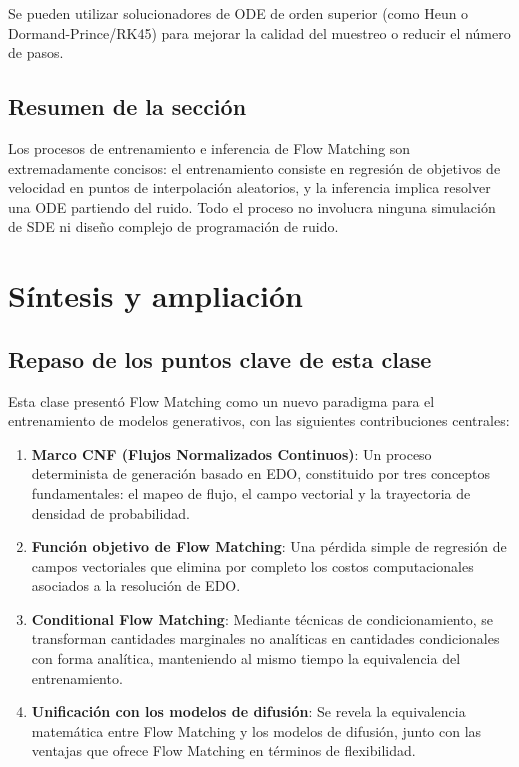 \documentclass[a4paper]{article}
\begin{document}
Se pueden utilizar solucionadores de ODE de orden superior (como Heun o Dormand-Prince/RK45) para mejorar la calidad del muestreo o reducir el número de pasos.

\subsection{Resumen de la sección}

Los procesos de entrenamiento e inferencia de Flow Matching son extremadamente concisos: el entrenamiento consiste en regresión de objetivos de velocidad en puntos de interpolación aleatorios, y la inferencia implica resolver una ODE partiendo del ruido. Todo el proceso no involucra ninguna simulación de SDE ni diseño complejo de programación de ruido.
\section{Síntesis y ampliación}

\subsection{Repaso de los puntos clave de esta clase}

Esta clase presentó Flow Matching como un nuevo paradigma para el entrenamiento de modelos generativos, con las siguientes contribuciones centrales:

\begin{enumerate}
    \item \textbf{Marco CNF (Flujos Normalizados Continuos)}: Un proceso determinista de generación basado en EDO, constituido por tres conceptos fundamentales: el mapeo de flujo, el campo vectorial y la trayectoria de densidad de probabilidad.
    \item \textbf{Función objetivo de Flow Matching}: Una pérdida simple de regresión de campos vectoriales que elimina por completo los costos computacionales asociados a la resolución de EDO.
    \item \textbf{Conditional Flow Matching}: Mediante técnicas de condicionamiento, se transforman cantidades marginales no analíticas en cantidades condicionales con forma analítica, manteniendo al mismo tiempo la equivalencia del entrenamiento.
    \item \textbf{Unificación con los modelos de difusión}: Se revela la equivalencia matemática entre Flow Matching y los modelos de difusión, junto con las ventajas que ofrece Flow Matching en términos de flexibilidad.
\end{enumerate}
\end{document}
